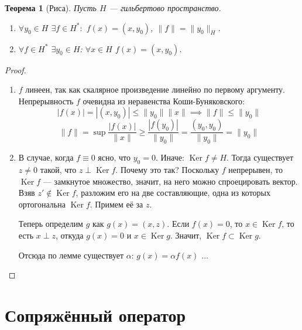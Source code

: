 \documentclass[11pt,openany,a4paper]{scrartcl}
\theoremstyle{plain}
\newtheorem{theorem}{Теорема}[section]
\theoremstyle{definition}
\DeclareMathOperator{\Ker}{Ker}
\begin{document}
\begin{theorem}[Риса]
    Пусть $H$ — гильбертово пространство.
    \begin{enumerate}
        \item $\forall y_0 \in H$ $\exists f \in H^\ast:$ $f(x) = (x, y_0)$,
        $\|f\| = \|y_0\|_H$.
        \item $\forall f \in H^\ast$ $\exists y_0 \in H$: $\forall x \in H$
        $f(x) = (x, y_0)$.
    \end{enumerate}
\end{theorem}
\begin{proof}
\mbox{}
    \begin{enumerate}
        \item $f$ линеен, так как скалярное произведение линейно по первому 
        аргументу. Непрерывность $f$ очевидна из неравенства Коши-Буняковского:
        $$
        |f(x)| = |(x, y_0)| \leqslant \|y_0\|\|x\| \implies
        \|f\| \leqslant \|y_0\|
        $$
        $$
        \|f\| = \sup \frac{|f(x)|}{\|x\|} \geqslant \frac{|f(y_0)|}{\|y_0\|} =
        \frac{(y_0, y_0)}{\|y_0\|} = \|y_0\|
        $$
        \item В случае, когда $f \equiv 0$ ясно, что $y_0 = 0$.
        Иначе: $\Ker f \neq H$. Тогда существует $z \neq 0$ такой, что
        $z \perp \Ker f$. Почему это так? Поскольку $f$ непрерывен, то $\Ker f$ —
        замкнутое множество, значит, на него можно спроецировать вектор. Взяв
        $z' \notin \Ker f$, разложим его на две составляющие, одна из которых
        ортогональна $\Ker f$. Примем её за $z$.
        
        Теперь определим $g$ как $g(x) = (x, z)$. Если $f(x) = 0$, то
        $x \in \Ker f$, то есть $x \perp z$, откуда $g(x) = 0$ и $x \in \Ker g$.
        Значит, $\Ker f \subset \Ker g$.
        
        Отсюда по лемме существует $\alpha$: $g(x) = \alpha f(x)$
        $\ldots$
    \end{enumerate}
\end{proof}

\section{Сопряжённый оператор}
\end{document}
